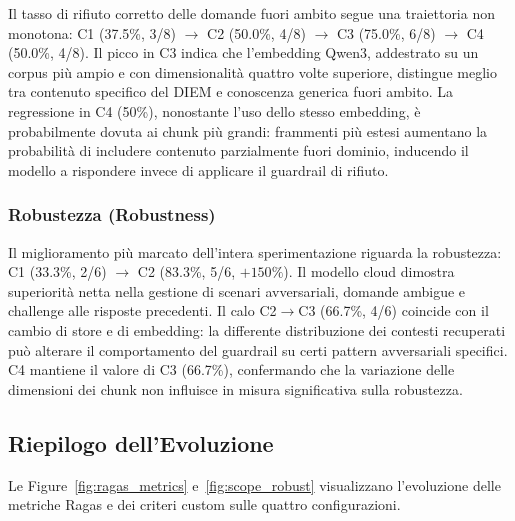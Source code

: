 \documentclass[11pt,a4paper]{article}
\begin{document}
Il tasso di rifiuto corretto delle domande fuori ambito segue una traiettoria non
monotona: C1 (37.5\%, 3/8) $\to$ C2 (50.0\%, 4/8) $\to$ C3 (75.0\%, 6/8) $\to$
C4 (50.0\%, 4/8). Il picco in C3 indica che l'embedding Qwen3, addestrato su un
corpus più ampio e con dimensionalità quattro volte superiore, distingue meglio
tra contenuto specifico del DIEM e conoscenza generica fuori ambito. La regressione
in C4 (50\%), nonostante l'uso dello stesso embedding, è probabilmente dovuta ai
chunk più grandi: frammenti più estesi aumentano la probabilità di includere
contenuto parzialmente fuori dominio, inducendo il modello a rispondere invece di
applicare il guardrail di rifiuto.

\subsubsection{Robustezza (Robustness)}

Il miglioramento più marcato dell'intera sperimentazione riguarda la robustezza:
C1 (33.3\%, 2/6) $\to$ C2 (83.3\%, 5/6, $+150\%$). Il modello cloud dimostra
superiorità netta nella gestione di scenari avversariali, domande ambigue e challenge
alle risposte precedenti. Il calo C2$\to$C3 (66.7\%, 4/6) coincide con il cambio
di store e di embedding: la differente distribuzione dei contesti recuperati può
alterare il comportamento del guardrail su certi pattern avversariali specifici.
C4 mantiene il valore di C3 (66.7\%), confermando che la variazione delle dimensioni
dei chunk non influisce in misura significativa sulla robustezza.

\subsection{Riepilogo dell'Evoluzione}
\label{subsec:evolution_summary}

Le Figure~\ref{fig:ragas_metrics} e~\ref{fig:scope_robust} visualizzano l'evoluzione
delle metriche Ragas e dei criteri custom sulle quattro configurazioni.
\end{document}
